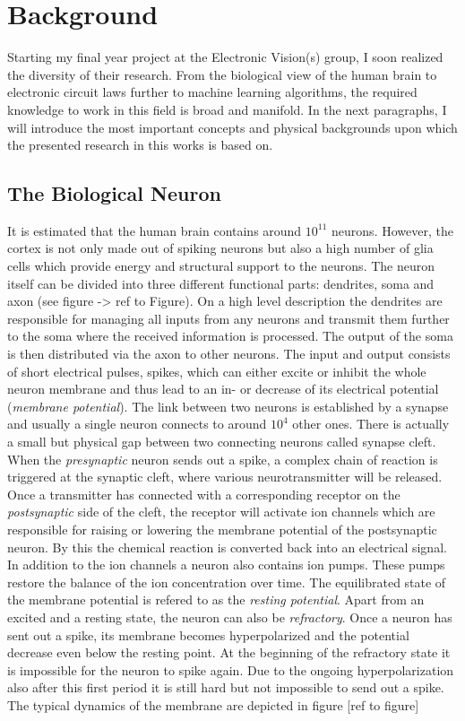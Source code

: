 \chapter{Background}
Starting my final year project at the Electronic Vision(s) group, I soon realized the diversity of their research. From the biological view of the human brain to electronic circuit laws further to machine learning algorithms, the required knowledge to work in this field is broad and manifold. In the next paragraphs, I will introduce the most important concepts and physical backgrounds upon which the presented research in this works is based on.

\section{The Biological Neuron}

It is estimated that the human brain contains around $10^11$ neurons. However, the cortex is not only made out of spiking neurons but also a high number of glia cells which provide energy and structural support to the neurons. The neuron itself can be divided into three different functional parts: dendrites, soma and axon (see figure -> ref to Figure). On a high level description the dendrites are responsible for managing all inputs from any neurons and transmit them further to the soma where the received information is processed. The output of the soma is then distributed via the axon to other neurons.  The input and output consists of short electrical pulses, spikes, which can either excite or inhibit the whole neuron membrane and thus lead to an in- or decrease of its electrical potential (\textit{membrane potential}). The link between two neurons is established by a synapse and usually a single neuron connects to around $10^4$ other ones. There is actually a small but physical gap between two connecting neurons called synapse cleft. When the \textit{presynaptic} neuron sends out a spike, a complex chain of reaction is triggered at the synaptic cleft, where various neurotransmitter will be released. Once a transmitter has connected with a corresponding receptor on the \textit{postsynaptic} side of the cleft, the receptor will activate ion channels which are responsible for raising or lowering the membrane potential of the postsynaptic neuron. By this the chemical reaction is converted back into an electrical signal.\\

In addition to the ion channels a neuron also contains ion pumps. These pumps restore the balance of the ion concentration over time. The equilibrated state of the membrane potential is refered to as the \textit{resting potential}. Apart from an excited and a resting state, the neuron can also be \textit{refractory}. Once a neuron has sent out a spike, its membrane becomes hyperpolarized and the potential decrease even below the resting point. At the beginning of the refractory state it is impossible for the neuron to spike again. Due to the ongoing hyperpolarization also after this first period it is still hard but not impossible to send out a spike. The typical dynamics of the membrane are depicted in figure [ref to figure]\\


